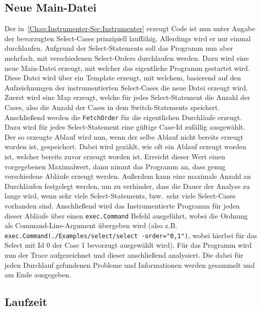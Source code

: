 \subsection{Neue Main-Datei}
Der in~\ref{Chap:Instrumenter-Sec:Instrumenter} erzeugt Code ist nun 
unter Angabe der bevorzugten Select-Cases
prinzipiell lauffähig. Allerdings wird er nur einmal durchlaufen. Aufgrund der 
Select-Statements soll das Programm nun aber mehrfach, mit verschiedenen 
Select-Orders durchlaufen werden. Dazu wird eine neue Main-Datei erzeugt, mit 
welcher das eigentliche Programm gestartet wird. Diese Datei wird über ein 
Template erzeugt, mit welchem, basierend auf den Aufzeichnungen der instrumentierten 
Select-Cases die neue Datei erzeugt wird. Zuerst wird eine Map erzeugt, welche 
für jedes Select-Statement die Anzahl der Cases, also die Anzahl der Cases in 
dem Switch-Statements speichert. Anschließend werden die \texttt{FetchOrder}
für die eigentlichen Durchläufe erzeugt. Dazu wird für jedes Select-Statement 
eine gültige Case-Id zufällig ausgewählt. Der so erzeugte Ablauf wird nun, 
wenn der selbe Ablauf nicht bereits erzeugt worden ist, gespeichert. 
Dabei wird gezählt, wie oft ein Ablauf erzeugt worden ist, welcher bereits 
zuvor erzeugt worden ist. Erreicht dieser Wert einen vorgegebenen Maximalwert,
dann nimmt das Programm an, dass genug verschiedene Abläufe erzeugt werden. 
Außerdem kann eine maximale Anzahl an Durchläufen festgelegt werden, um zu 
verhinder, dass die Dauer der Analyse zu lange wird, wenn sehr viele Select-Statements,
bzw.\ sehr viele Select-Cases vorhanden sind. Anschließend wird das Instrumentierte 
Programm für jeden dieser Abläufe über einen \texttt{exec.Command} Befehl 
ausgeführt, wobei die Ordnung als Command-Line-Argument übergeben wird 
(also z.B. \texttt{exec.Command(./Examples/select/select -order="0,1")}, 
wobei hierbei für das Select mit Id 0 der Case 1 bevorzugt ausgewählt
wird). Für das Programm wird nun der Trace aufgezeichnet und dieser 
anschließend analysiert. Die dabei für jeden Durchlauf gefundenen Probleme 
und Informationen werden gesammelt und am Ende ausgegeben. 


\subsection{Laufzeit}\label{Chap:Tracer-Sec:Laufzeit}
